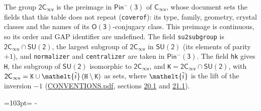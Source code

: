 \documentclass[10pt,a4paper]{article}
\newcommand{\needspace}[1]{\par\penalty-100\begingroup\dimen0=#1\relax\dimen2=\pagegoal
  \advance\dimen2-\pagetotal\ifdim\dimen0>\dimen2\relax\ifdim\dimen2>0pt\vfil\break\fi\fi
  \endgroup}
\numberwithin{equation}{section}
\newcommand{\eltfont}[1]{{\let\sigma\eltsigma\mathelt{#1}}}
\newcommand{\grp}[1]{\mathsf{#1}}
\newcommand{\elt}[1]{\eltfont{#1}}
\newcommand{\lift}[1]{\tilde{#1}}
\begin{document}
\leavevmode\label{n:group.preimage}The group $\grp{2C_{\infty v}}$ is the preimage in $\grp{Pin^{-}(3)}$ of \href{../../../rotation/data/pdf/Cinfv.pdf}{$\grp{C_{\infty v}}$}, whose document sets the fields that this table does not repeat (\texttt{coverof}): its type, family, geometry, crystal classes and the names of its \href{../../../rotation/data/pdf/O3.pdf}{$\grp{O(3)}$}-conjugacy class. This preimage is continuous, so its order and GAP identifier are undefined. The field \texttt{su2subgroup} is $\grp{2C_{\infty v}} \cap \grp{SU(2)}$, the largest subgroup of $\grp{2C_{\infty v}}$ in $\grp{SU(2)}$ (its elements of parity $+1$), and \texttt{normalizer} and \texttt{centralizer} are taken in $\grp{Pin^{-}(3)}$. The field \texttt{hk} gives \texttt{H}, the subgroup of $\grp{SU(2)}$ isomorphic to $\grp{2C_{\infty v}}$, and \texttt{K}${} = \grp{2C_{\infty v}} \cap \grp{SU(2)}$, with $\grp{2C_{\infty v}} = \texttt{K} \cup \elt{\lift{i}}\,(\texttt{H} \setminus \texttt{K})$ as sets, where $\elt{\lift{i}}$ is the lift of the inversion $-1$ (\href{../../CONVENTIONS.pdf}{CONVENTIONS.pdf}, sections \href{../../CONVENTIONS.pdf\#conv.20.1}{20.1} and \href{../../CONVENTIONS.pdf\#conv.21.1}{21.1}).
\needspace{103pt}
\end{document}
